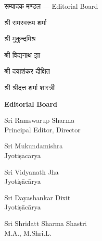 \documentclass[11pt,a4paper]{article}
\newcommand{\dev}[1]{{\devanagarifont #1}}
\newcommand{\devbold}[1]{{\devanagarifontbold #1}}
\newenvironment{simpleverse}{%
  \list{}{\itemsep 0pt \parsep 0pt \topsep 4pt \leftmargin 2em}%
  \item\relax\ignorespaces
}{\endlist}
\begin{document}
\begin{paracol}{2}
\begin{leftcolumn*}
\begin{center}
\devbold{सम्पादक मण्डल — Editorial Board}
\end{center}

\begin{simpleverse}
\dev{श्री रामस्वरूप शर्मा}\\
\hspace{2em}\dev{प्रधान सम्पादक, संचालक}

\dev{श्री मुकुन्दमिश्र}\\
\hspace{2em}\dev{ज्योतिषाचार्य}

\dev{श्री विद्यनाथ झा}\\
\hspace{2em}\dev{ज्योतिषाचार्य}

\dev{श्री दयाशंकर दीक्षित}\\
\hspace{2em}\dev{ज्योतिषाचार्य}

\dev{श्री श्रीदत्त शर्मा शास्त्री}\\
\hspace{2em}\dev{एम. ए., एम. श्री. एल.}
\end{simpleverse}
\end{leftcolumn*}

\begin{rightcolumn}
\begin{center}
\textbf{Editorial Board}
\end{center}

\begin{simpleverse}
Sri Ramswarup Sharma\\
\hspace{2em}Principal Editor, Director

Sri Mukundamishra\\
\hspace{2em}Jyotiṣācārya

Sri Vidyanath Jha\\
\hspace{2em}Jyotiṣācārya

Sri Dayashankar Dixit\\
\hspace{2em}Jyotiṣācārya

Sri Shridatt Sharma Shastri\\
\hspace{2em}M.A., M.Shri.L.
\end{simpleverse}
\end{rightcolumn}
\end{paracol}
\end{document}
